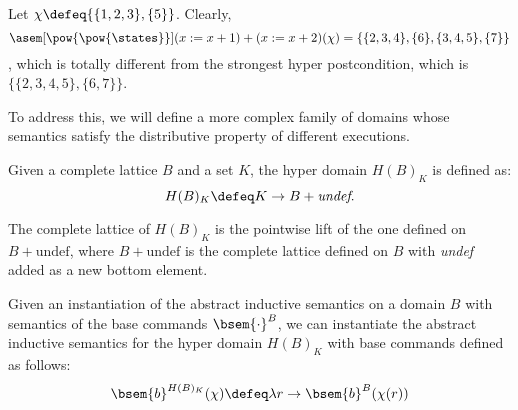 \begin{example}
  \label{exmp:determinism}
  Let $\chi \defeq \{\{1, 2, 3\}, \{5\}\}$. Clearly,
  $$\asem[\pow{\pow{\states}}]{(x := x + 1) + (x := x + 2)}(\chi) = 
  \{\{2, 3, 4\}, \{6\}, \{3, 4, 5\}, \{7\}\}$$,
  which is totally different from the strongest hyper postcondition, 
  which is $\{\{2, 3, 4, 5\}, \{6, 7\}\}$.
\end{example}

To address this, we will define a more complex family of domains whose semantics 
satisfy the distributive property of different executions.

\begin{definition}
  Given a complete lattice $B$ and a set $K$, the hyper domain $H(B)_K$ is 
  defined as:
  $$H(B)_K \defeq K \to B + \textit{undef}.$$

  The complete lattice of $H(B)_K$ is the pointwise lift of the one defined on 
  $B + \text{undef}$, where $B + \text{undef}$ is the complete lattice defined 
  on $B$ with \textit{undef} added as a new bottom element.
\end{definition}

\begin{definition}
  Given an instantiation of the abstract inductive semantics on a domain $B$ 
  with semantics of the base commands $\bsem{\cdot}^B$, we can instantiate the 
  abstract inductive semantics for the hyper domain $H(B)_K$ with base 
  commands defined as follows:
  $$\bsem{b}^{H(B)_K}(\chi) \defeq \lambda r \to \bsem{b}^B(\chi(r))$$
\end{definition}

